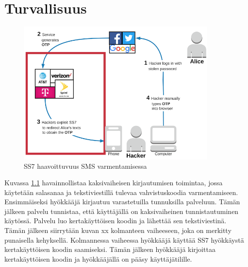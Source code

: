 \chapter{Turvallisuus\label{Turvallisuus}}


\begin{figure}
    \centering
    \includegraphics[width=10cm]{template/figures/SS7 attack vulnerable.png}
    \caption{SS7 haavoittuvuus SMS varmentamisessa}
    \label{fig:ss7SMSM}
\end{figure}

Kuvassa \ref{fig:ss7SMSM} havainnollistaa kaksivaiheisen kirjautumisen toimintaa, jossa käytetään salasanaa ja tekstiviestillä tulevaa vahvistuskoodia varmentamiseen. Ensimmäiseksi hyökkääjä kirjautuu varastetuilla tunnuksilla palveluun. Tämän jälkeen palvelu tunnistaa, että käyttäjällä on kaksivaiheinen tunnistautuminen käytössä. Palvelu luo kertakäyttöisen koodin ja lähettää sen tekstiviestinä. Tämän jälkeen siirrytään kuvan xx kolmanteen vaiheeseen, joka on merkitty punaisella kehyksellä. Kolmannessa vaiheessa hyökkääjä käyttää SS7 hyökkäystä kertakäyttöisen koodin saamiseksi. Tämän jälkeen hyökkääjä kirjoittaa kertakäyttöisen koodin ja hyökkääjällä on pääsy käyttäjätilille.